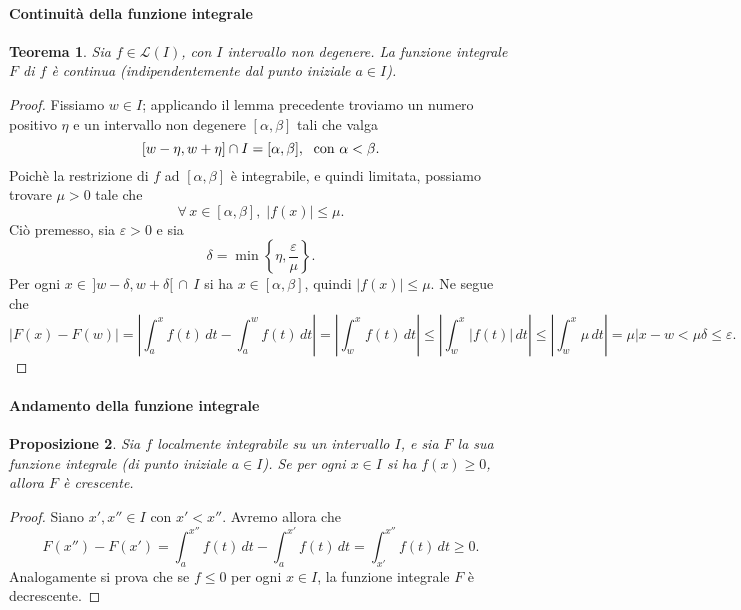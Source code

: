 \documentclass{article}
\theoremstyle{plain}
\newtheorem{thm}{Teorema}[section]
\newtheorem{prop}[thm]{Proposizione}
\theoremstyle{definition}
\theoremstyle{remark}
\begin{document}
\paragraph{Continuità della funzione integrale}
\begin{bxthm}
\begin{thm}
    Sia $f\in\mathcal{L}(I)$, con $I$ intervallo non degenere. La funzione integrale $F$ di $f$ è continua (indipendentemente dal punto iniziale $a\in I$).
\end{thm}
\end{bxthm}
\begin{proof}
    Fissiamo $w\in I$; applicando il lemma precedente troviamo un numero positivo $\eta$ e un intervallo non degenere $[\alpha,\beta]$ tali che valga
    \[[w-\eta,w+\eta]\cap I=[\alpha,\beta],\;\textup{ con }\alpha<\beta.\]
    Poichè la restrizione di $f$ ad $[\alpha,\beta]$ è integrabile, e quindi limitata, possiamo trovare $\mu>0$ tale che 
    \[\forall\,x\in[\alpha,\beta],\;|f(x)|\leq\mu.\]
    Ciò premesso, sia $\varepsilon>0$ e sia \[\delta=\min\left\{\eta,\dfrac{\varepsilon}{\mu}\right\}.\]
    Per ogni $x\in\, ]w-\delta,w+\delta[\,\cap\, I$ si ha $x\in [\alpha,\beta]$, quindi $|f(x)|\leq\mu$. Ne segue che 
    \[ |F(x)-F(w)|=\left|\int_{a}^{x}f(t)\,dt-\int_{a}^{w}f(t)\,dt\right|=\left|\int_{w}^{x}f(t)\,dt\right|\leq\left|\int_{w}^{x}|f(t)|\,dt\right|\leq\left|\int_{w}^{x}\mu\,dt\right|=\mu|x-w <\mu\delta\leq\varepsilon. \]
\end{proof}

\vspace{10pt}

\paragraph{Andamento della funzione integrale}
\begin{bxthm}
\begin{prop}
    Sia $f$ localmente integrabile su un intervallo $I$, e sia $F$ la sua funzione integrale (di punto iniziale $a\in I$).
    Se per ogni $x\in I$ si ha $f(x)\geq0$, allora $F$ è crescente.
\end{prop}
\end{bxthm}
\begin{proof}
    Siano $x',x''\in I$ con $x'<x''$. Avremo allora che 
    \[F(x'')-F(x')=\int_{a}^{x''}f(t)\,dt-\int_{a}^{x'}f(t)\,dt=\int_{x'}^{x''}f(t)\,dt\geq0.\]
    Analogamente si prova che se $f\leq0$ per ogni $x\in I$, la funzione integrale $F$ è decrescente.
\end{proof}
\end{document}
